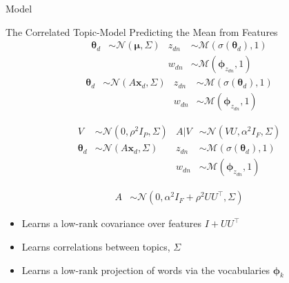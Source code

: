 \documentclass[xcolor=dvipsnames]{beamer}
\newcommand \T { ^\top }
\newcommand \vv[1] { \boldsymbol #1 }
\newcommand \thd[0]  { { \vv \theta_d } }
\newcommand \xd      { { \vv x_d } }
\newcommand \nor[2]   { \mathcal{N} \left( {#1}, {#2} \right) }
\newcommand \mnor[3]  { \mathcal{N} \left(#1, #2, #3\right) }
\newcommand \muln[2]  { \mathcal{M} \left( {#1},{#2} \right) }
\begin{document}
\begin{frame}{Model}

 { The Correlated Topic-Model }
 { Predicting the Mean from Features}
 {
    \begin{align*}
    \vv{\theta}_d & \sim \nor{\vv{\mu}}{\Sigma} & z_{dn} & \sim \muln{\sigma(\thd)}{1} \\
    & & w_{dn} & \sim \muln{\vv{\phi}_{z_{dn}}}{1} 
    \end{align*}
}
 {
    \begin{align*}
    \vv{\theta}_d & \sim \nor{A\xd}{\Sigma} & z_{dn} & \sim \muln{\sigma(\thd)}{1} \\
    & & w_{dn} & \sim \muln{\vv{\phi}_{z_{dn}}}{1} 
    \end{align*}
}

 {
    \begin{align*}
    V & \sim \mnor{0}{\rho^2 I_P}{\Sigma} & A|V & \sim \mnor{VU}{\alpha^2 I_F}{\Sigma} \\
    \vv{\theta}_d & \sim \nor{A\xd}{\Sigma} & z_{dn} & \sim \muln{\sigma(\thd)}{1} \\
    & & w_{dn} & \sim \muln{\vv{\phi}_{z_{dn}}}{1} 
    \end{align*}
}

 {
    \begin{align*}
    A & \sim \mnor{0}{\alpha^2 I_F + \rho^{2}UU\T}{\Sigma} 
    \end{align*}
}

 {
    \begin{itemize}
        \item Learns a low-rank covariance over features $I + UU\T$
        \item Learns correlations between topics, $\Sigma$
        \item Learns a low-rank projection of words via the vocabularies $\vv{\phi}_k$
    \end{itemize}
}

\end{frame}
\end{document}
